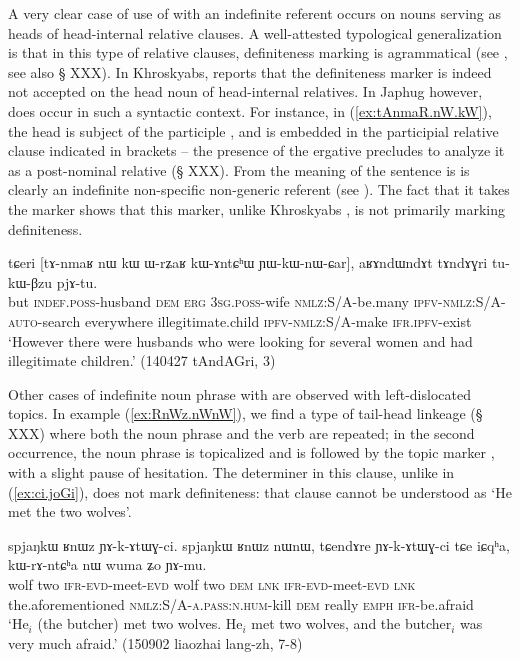 A very clear case of use of  with an indefinite referent occurs on nouns serving as heads of head-internal relative clauses. A well-attested typological generalization is that in this type of relative clauses, definiteness marking is agrammatical (see \citealt{basilico96internally}, see also § XXX). In Khroskyabs, \citet[636]{lai17khroskyabs} reports that the definiteness marker  is indeed not accepted on the head noun of head-internal relatives. In Japhug however,  does occur in such a syntactic context. For instance, in (\ref{ex:tAnmaR.nW.kW}), the head  is subject of the participle , and is embedded in the participial relative clause indicated in brackets -- the presence of the ergative  precludes to analyze it as a post-nominal relative (§ XXX). From the meaning of the sentence is is clearly an indefinite non-specific non-generic referent (see \citealt[260]{lehmann84relativsatz}). The fact that it takes the marker  shows that this marker, unlike Khroskyabs , is not primarily marking definiteness.

\begin{exe}
\ex \label{ex:tAnmaR.nW.kW}
 \gll tɕeri [tɤ-nmaʁ nɯ kɯ ɯ-rʑaʁ kɯ-ɤntɕʰɯ ɲɯ-kɯ-nɯ-ɕar], aʁɤndɯndɤt tɤndɤɣri tu-kɯ-βzu pjɤ-tu.  \\
but  \textsc{indef}.\textsc{poss}-husband \textsc{dem} \textsc{erg} \textsc{3sg}.\textsc{poss}-wife  \textsc{nmlz}:S/A-be.many \textsc{ipfv}-\textsc{nmlz}:S/A-\textsc{auto}-search everywhere  illegitimate.child  \textsc{ipfv}-\textsc{nmlz}:S/A-make \textsc{ifr}.\textsc{ipfv}-exist \\
\glt `However there were husbands who were looking for several women and had illegitimate children.' (140427 tAndAGri, 3)
\end{exe}

Other cases of indefinite noun phrase with  are observed with left-dislocated topics. In example (\ref{ex:RnWz.nWnW}), we find a type of tail-head linkeage  (§ XXX) where both the noun phrase  and the verb  are repeated; in the second occurrence, the noun phrase is topicalized and is followed by the topic marker , with a slight pause of hesitation. The determiner  in this clause, unlike  in (\ref{ex:ci.joGi}), does not mark definiteness: that clause cannot be understood as `He met the two wolves'.

\begin{exe} 
\ex \label{ex:RnWz.nWnW} 
 \gll spjaŋkɯ ʁnɯz ɲɤ-k-ɤtɯɣ-ci. spjaŋkɯ ʁnɯz nɯnɯ, tɕendɤre ɲɤ-k-ɤtɯɣ-ci tɕe iɕqʰa, kɯ-rɤ-ntɕʰa nɯ wuma ʑo ɲɤ-mu. \\ 
 wolf two \textsc{ifr}-\textsc{evd}-meet-\textsc{evd}  wolf two \textsc{dem} \textsc{lnk} \textsc{ifr}-\textsc{evd}-meet-\textsc{evd} \textsc{lnk} the.aforementioned \textsc{nmlz}:S/A-\textsc{a.pass}:\textsc{n.hum}-kill \textsc{dem} really \textsc{emph} \textsc{ifr}-be.afraid \\ 
 \glt `He$_i$ (the butcher) met two wolves. He$_i$ met two wolves, and the butcher$_i$ was very much afraid.' (150902 liaozhai lang-zh, 7-8)
\end{exe}

